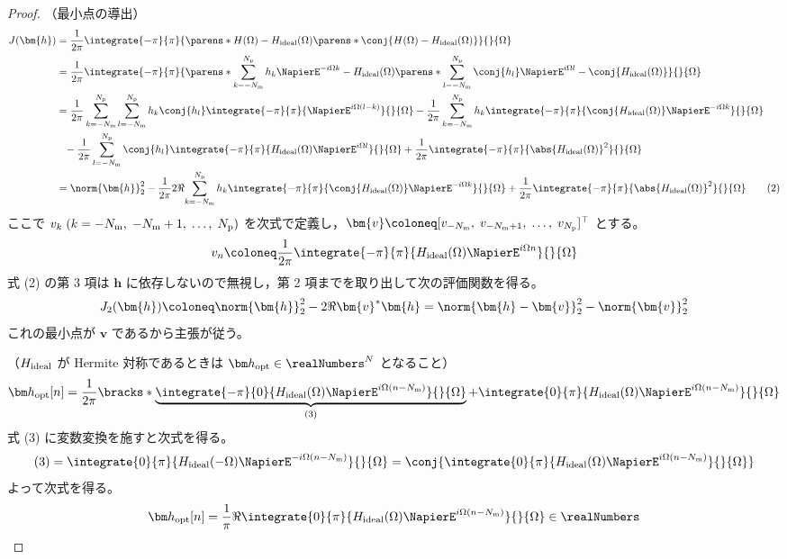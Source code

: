             \begin{proof}
                \quad\par\noindent
                （最小点の導出）
                \begin{align*}
                    J(\bm{h}) &= \frac{1}{2\pi}\integrate{-\pi}{\pi}{\parens*{H(\Omega)-\Hideal(\Omega)}\parens*{\conj{H(\Omega)-\Hideal(\Omega)}}}{}{\Omega} \\
                    &= \frac{1}{2\pi}\integrate{-\pi}{\pi}{\parens*{\sum_{k=-\Nm}^\Np h_k\NapierE^{-i\Omega k} -\Hideal(\Omega)}\parens*{\sum_{l=-\Nm}^\Np \conj{h_l}\NapierE^{i\Omega l} -\conj{\Hideal(\Omega)}}}{}{\Omega} \\
                    &= \frac{1}{2\pi}\sum_{k=-\Nm}^\Np\sum_{l=-\Nm}^\Np h_k\conj{h_l}\integrate{-\pi}{\pi}{\NapierE^{i\Omega(l-k)}}{}{\Omega} - \frac{1}{2\pi}\sum_{k=-\Nm}^\Np h_k\integrate{-\pi}{\pi}{\conj{\Hideal(\Omega)}\NapierE^{-i\Omega k}}{}{\Omega} \\
                    &\phantom{=}- \frac{1}{2\pi}\sum_{l=-\Nm}^\Np \conj{h_l}\integrate{-\pi}{\pi}{\Hideal(\Omega)\NapierE^{i\Omega l}}{}{\Omega} + \frac{1}{2\pi}\integrate{-\pi}{\pi}{\abs{\Hideal(\Omega)}^2}{}{\Omega} \\
                    &= \norm{\bm{h}}_2^2 - \frac{1}{2\pi}2\Re{\sum_{k=-\Nm}^\Np h_k\integrate{-\pi}{\pi}{\conj{\Hideal(\Omega)}\NapierE^{-i\Omega k}}{}{\Omega}} + \frac{1}{2\pi}\integrate{-\pi}{\pi}{\abs{\Hideal(\Omega)}^2}{}{\Omega} \tag{2}
                \end{align*}
                ここで $v_k\;(k=-{N_\text{m}},\;-{N_\text{m}}+1,\;\dots,\;{N_\text{p}})$ を次式で定義し，$\bm{v}\coloneq[v_{-\Nm},\;v_{-\Nm+1},\;\dots,\;v_\Np]^\top$ とする。
                \[ v_n \coloneq \frac{1}{2\pi}\integrate{-\pi}{\pi}{\Hideal(\Omega)\NapierE^{i\Omega n}}{}{\Omega} \]
                式 (2) の第 3 項は $\bm{h}$ に依存しないので無視し，第 2 項までを取り出して次の評価関数を得る。
                \[ J_2(\bm{h}) \coloneq \norm{\bm{h}}_2^2 - 2\Re{\bm{v}^*\bm{h}} = \norm{\bm{h} - \bm{v}}_2^2 - \norm{\bm{v}}_2^2 \]
                これの最小点が $\bm{v}$ であるから主張が従う。
                \newline
                \par\noindent
                （$H_\text{ideal}$ が Hermite 対称であるときは $\vhOpt\in\realNumbers^N$ となること）
                \[ \vhOpt[n] = \frac{1}{2\pi}\bracks*{\underbrace{\integrate{-\pi}{0}{\Hideal(\Omega)\NapierE^{i\Omega (n-\Nm)}}{}{\Omega}}_{(3)} + \integrate{0}{\pi}{\Hideal(\Omega)\NapierE^{i\Omega (n-\Nm)}}{}{\Omega}} \]
                式 (3) に変数変換を施すと次式を得る。
                \[ (3) = \integrate{0}{\pi}{\Hideal(-\Omega)\NapierE^{-i\Omega (n-\Nm)}}{}{\Omega} = \conj{\integrate{0}{\pi}{\Hideal(\Omega)\NapierE^{i\Omega (n-\Nm)}}{}{\Omega}} \]
                よって次式を得る。
                \[ \vhOpt[n] = \frac{1}{\pi}\Re{\integrate{0}{\pi}{\Hideal(\Omega)\NapierE^{i\Omega (n-\Nm)}}{}{\Omega}}\in\realNumbers \]
            \end{proof}
